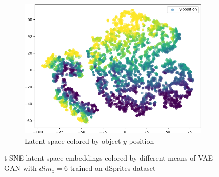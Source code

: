 \begin{figure}[H]
    \hfill
    \begin{subfigure}{.19\textwidth}
        \includegraphics[width=\textwidth]{images/latent_spaces/dsprites/vae_gan/embeddings_mu_4.png}
        \caption{Latent space colored by object $y$-position}
    \end{subfigure}
    \caption[\ac{VAE}-\ac{GAN} Latent Space - dSprites]{\ac{t-SNE} latent space embeddings colored by different means of \ac{VAE}-\ac{GAN} with $dim_z=6$ trained on dSprites dataset}
    \label{fig:vae_gan_latent_space_dsprites}
\end{figure}

